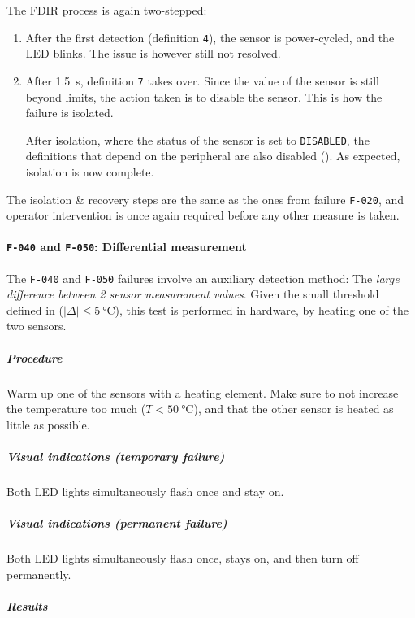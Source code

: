 \documentclass[a4paper,nobib,final]{tufte-book}
\begin{document}
The \acs{FDIR} process is again two-stepped:
\begin{enumerate}
	\item After the first detection (definition \texttt{4}), the sensor is power-cycled, and the \acs{LED} blinks. The issue is however still not resolved.
	\item After \SI{1.5}{\second}, definition \texttt{7} takes over. Since the value of the sensor is still beyond limits, the action taken is to disable the sensor. This is how the failure is isolated.
	
	After isolation, where the status of the sensor is set to \texttt{DISABLED}, the definitions that depend on the peripheral are also disabled (\invalid). As expected, isolation is now complete.
\end{enumerate}

The isolation \& recovery steps are the same as the ones from failure \texttt{F-020}, and operator intervention is once again required before any other measure is taken.


\clearpage
\paragraph{\textbf{\texttt{F-040} and \texttt{F-050}: Differential measurement}}\hspace{0pt}

The \texttt{F-040} and \texttt{F-050} failures involve an auxiliary detection method: The \emph{large difference between 2 sensor measurement values}. Given the small threshold defined in  (\(\lvert \Delta \rvert \leq \SI{5}{\celsius}\)), this test is performed in hardware, by heating one of the two sensors.

\subparagraph{Procedure}
\begin{compactenum}
	\item Warm up one of the sensors with a heating element. Make sure to not increase the temperature too much (\(T < \SI{50}{\celsius}\)), and that the other sensor is heated as little as possible.
\end{compactenum}

\subparagraph{Visual indications (temporary failure)} Both \acs{LED} lights simultaneously flash once and stay on.
\subparagraph{Visual indications (permanent failure)} Both \acs{LED} lights simultaneously flash once, stays on, and then turn off permanently.

\subparagraph{Results}\hspace{0pt}
\end{document}

